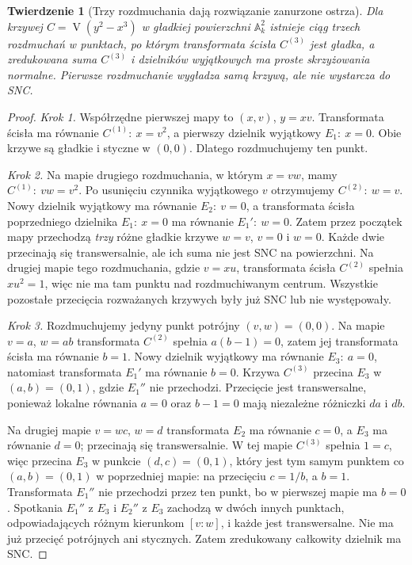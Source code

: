 \documentclass[11pt,a4paper,openany]{report}
\numberwithin{equation}{section}
\theoremstyle{plain}
\newtheorem{twierdzenie}{Twierdzenie}[section]
\theoremstyle{definition}
\theoremstyle{remark}
\newcommand{\A}{\mathbb A}
\newcommand{\V}{\operatorname V}
\begin{document}
\begin{twierdzenie}[Trzy rozdmuchania dają rozwiązanie zanurzone ostrza]
\label{tw:ga5-embedded-cusp}
Dla krzywej $C=\V(y^2-x^3)$ w gładkiej powierzchni
$\A^2_k$ istnieje ciąg trzech rozdmuchań w punktach,
po którym transformata ścisła $C^{(3)}$ jest gładka,
a zredukowana suma $C^{(3)}$ i dzielników wyjątkowych
ma proste skrzyżowania normalne. Pierwsze rozdmuchanie
wygładza samą krzywą, ale nie wystarcza do SNC.
\end{twierdzenie}
\begin{proof}
\emph{Krok 1.} Współrzędne pierwszej mapy to
$(x,v)$, $y=xv$. Transformata ścisła ma równanie
$C^{(1)}:\ x=v^2$, a pierwszy dzielnik wyjątkowy
$E_1:\ x=0$. Obie krzywe są gładkie i styczne
w $(0,0)$. Dlatego rozdmuchujemy ten punkt.

\emph{Krok 2.} Na mapie drugiego rozdmuchania,
w którym $x=vw$, mamy
$C^{(1)}:\ vw=v^2$. Po usunięciu czynnika
wyjątkowego $v$ otrzymujemy
$C^{(2)}:\ w=v$. Nowy dzielnik wyjątkowy ma
równanie $E_2:\ v=0$, a transformata ścisła
poprzedniego dzielnika $E_1:\ x=0$ ma równanie
$E_1':\ w=0$. Zatem przez początek mapy
przechodzą \emph{trzy} różne gładkie krzywe
$w=v$, $v=0$ i $w=0$. Każde dwie przecinają się
transwersalnie, ale ich suma nie jest SNC na powierzchni.
Na drugiej mapie tego rozdmuchania, gdzie $v=xu$,
transformata ścisła $C^{(2)}$ spełnia $xu^2=1$,
więc nie ma tam punktu nad rozdmuchiwanym centrum.
Wszystkie pozostałe przecięcia rozważanych krzywych
były już SNC lub nie występowały.

\emph{Krok 3.} Rozdmuchujemy jedyny punkt potrójny
$(v,w)=(0,0)$. Na mapie $v=a$, $w=ab$
transformata $C^{(2)}$ spełnia
$a(b-1)=0$, zatem jej transformata ścisła ma
równanie $b=1$. Nowy dzielnik wyjątkowy ma
równanie $E_3:\ a=0$, natomiast transformata $E_1'$
ma równanie $b=0$. Krzywa $C^{(3)}$ przecina
$E_3$ w $(a,b)=(0,1)$, gdzie $E_1''$ nie przechodzi.
Przecięcie jest transwersalne, ponieważ lokalne
równania $a=0$ oraz $b-1=0$ mają niezależne
różniczki $da$ i $db$.

Na drugiej mapie $v=wc$, $w=d$ transformata
$E_2$ ma równanie $c=0$, a $E_3$ ma równanie
$d=0$; przecinają się transwersalnie. W tej mapie
$C^{(3)}$ spełnia $1=c$, więc przecina $E_3$
w punkcie $(d,c)=(0,1)$, który jest tym samym
punktem co $(a,b)=(0,1)$ w poprzedniej mapie:
na przecięciu $c=1/b$, a $b=1$.
Transformata $E_1''$ nie przechodzi przez ten punkt,
bo w pierwszej mapie ma $b=0$. Spotkania
$E_1''$ z $E_3$ i $E_2''$ z $E_3$ zachodzą
w dwóch innych punktach, odpowiadających różnym
kierunkom $[v:w]$, i każde jest transwersalne.
Nie ma już przecięć potrójnych ani stycznych.
Zatem zredukowany całkowity dzielnik ma SNC.
\end{proof}
\end{document}
